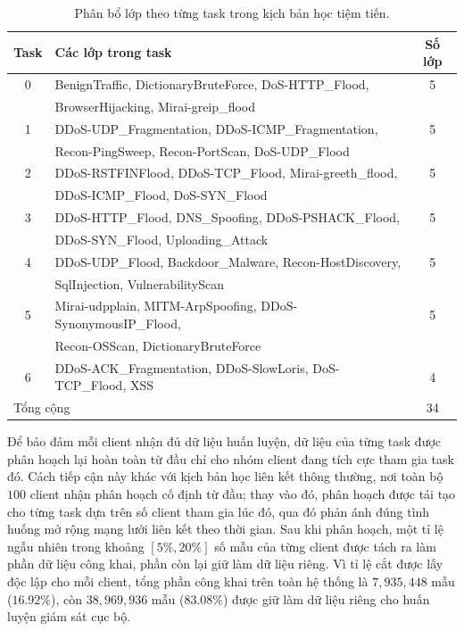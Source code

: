 \begin{table}[H]
    \centering
    \caption{Phân bổ lớp theo từng task trong kịch bản học tiệm tiến.}
    \label{tab:cil_task_classes}
    \small
    \begin{tabular}{clc}
        \hline
        Task & Các lớp trong task & Số lớp \\
        \hline
        0 & BenignTraffic, DictionaryBruteForce, DoS-HTTP\_Flood, & 5 \\
          & BrowserHijacking, Mirai-greip\_flood & \\
        1 & DDoS-UDP\_Fragmentation, DDoS-ICMP\_Fragmentation, & 5 \\
          & Recon-PingSweep, Recon-PortScan, DoS-UDP\_Flood & \\
        2 & DDoS-RSTFINFlood, DDoS-TCP\_Flood, Mirai-greeth\_flood, & 5 \\
          & DDoS-ICMP\_Flood, DoS-SYN\_Flood & \\
        3 & DDoS-HTTP\_Flood, DNS\_Spoofing, DDoS-PSHACK\_Flood, & 5 \\
          & DDoS-SYN\_Flood, Uploading\_Attack & \\
        4 & DDoS-UDP\_Flood, Backdoor\_Malware, Recon-HostDiscovery, & 5 \\
          & SqlInjection, VulnerabilityScan & \\
        5 & Mirai-udpplain, MITM-ArpSpoofing, DDoS-SynonymousIP\_Flood, & 5 \\
          & Recon-OSScan, DictionaryBruteForce & \\
        6 & DDoS-ACK\_Fragmentation, DDoS-SlowLoris, DoS-TCP\_Flood, XSS & 4 \\
        \hline
        \multicolumn{2}{l}{Tổng cộng} & 34 \\
        \hline
    \end{tabular}
\end{table}

Để bảo đảm mỗi client nhận đủ dữ liệu huấn luyện, dữ liệu của từng task được phân hoạch lại hoàn toàn từ đầu chỉ cho nhóm client đang tích cực tham gia task đó. Cách tiếp cận này khác với kịch bản học liên kết thông thường, nơi toàn bộ $100$ client nhận phân hoạch cố định từ đầu; thay vào đó, phân hoạch được tái tạo cho từng task dựa trên số client tham gia lúc đó, qua đó phản ánh đúng tình huống mở rộng mạng lưới liên kết theo thời gian. Sau khi phân hoạch, một tỉ lệ ngẫu nhiên trong khoảng $[5\%, 20\%]$ số mẫu của từng client được tách ra làm phần dữ liệu công khai, phần còn lại giữ làm dữ liệu riêng. Vì tỉ lệ cắt được lấy độc lập cho mỗi client, tổng phần công khai trên toàn hệ thống là $7{,}935{,}448$ mẫu ($16.92\%$), còn $38{,}969{,}936$ mẫu ($83.08\%$) được giữ làm dữ liệu riêng cho huấn luyện giám sát cục bộ.

